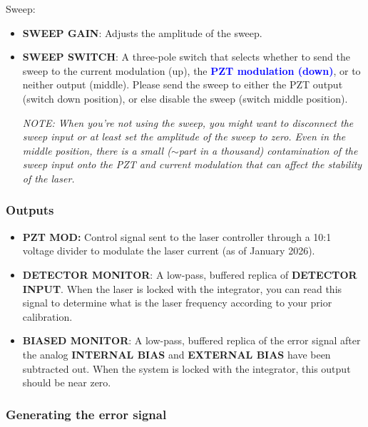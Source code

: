 \documentclass{../lab}
\begin{document}
Sweep:

\begin{itemize}
    \item \textbf{SWEEP GAIN}: Adjusts the amplitude of the sweep.

    \item \textbf{SWEEP SWITCH}: A three-pole switch that selects whether to send the sweep to the current modulation (up), the \textcolor{blue}{\textbf{PZT modulation (down)}}, or to neither output (middle). Please send the sweep to either the PZT output (switch down position), or else disable the sweep (switch middle position).
    
    \emph{NOTE: When you're not using the sweep, you might want to disconnect the sweep input or at least set the amplitude of the sweep to zero. Even in the middle position, there is a small ($\sim$part in a thousand) contamination of the sweep input onto the PZT and current modulation that can affect the stability of the laser.}
\end{itemize}

\subsubsection{Outputs}

\begin{itemize}
    \item \textbf{PZT MOD:} Control signal sent to the laser controller through a 10:1 voltage divider to modulate the laser current (as of January 2026). %


    \item \textbf{DETECTOR MONITOR}: A low-pass, buffered replica of \textbf{DETECTOR INPUT}. When the laser is locked with the integrator, you can read this signal to determine what is the laser frequency according to your prior calibration.

    \item \textbf{BIASED MONITOR}: A low-pass, buffered replica of the error signal after the analog \textbf{INTERNAL BIAS} and \textbf{EXTERNAL BIAS} have been subtracted out. When the system is locked with the integrator, this output should be near zero.
\end{itemize}

\subsubsection{Generating the error signal}
\label{sec:generating_error_signal}
\end{document}

